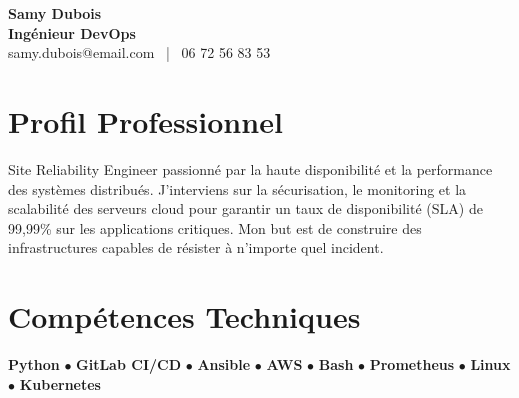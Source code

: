 \documentclass[11pt,a4paper]{article}
\begin{document}
\begin{center}
    {\Huge \textbf{Samy Dubois}} \\[0.2cm]
    {\Large \textbf{Ingénieur DevOps}} \\[0.1cm]
    samy.dubois@email.com \ | \ 06 72 56 83 53
\end{center}

\vspace{0.3cm}

\section*{Profil Professionnel}
\noindent
Site Reliability Engineer passionné par la haute disponibilité et la performance des systèmes distribués. J'interviens sur la sécurisation, le monitoring et la scalabilité des serveurs cloud pour garantir un taux de disponibilité (SLA) de 99,99\% sur les applications critiques. Mon but est de construire des infrastructures capables de résister à n'importe quel incident.

\vspace{0.3cm}

\section*{Compétences Techniques}
\noindent
\textbf{Python} $\bullet$ \textbf{GitLab CI/CD} $\bullet$ \textbf{Ansible} $\bullet$ \textbf{AWS} $\bullet$ \textbf{Bash} $\bullet$ \textbf{Prometheus} $\bullet$ \textbf{Linux} $\bullet$ \textbf{Kubernetes}

\vspace{0.3cm}

\end{document}
